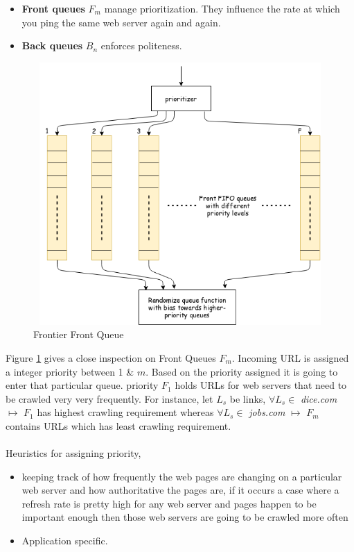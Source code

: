 \begin{itemize}
\item \textbf{Front queues} $F_m$ manage prioritization. They influence the rate at which you ping the
  same web server again and again.
  \item \textbf{Back queues} $B_n$ enforces politeness.
\end{itemize}

\pagebreak

\begin{figure}[h!]
  \centering
  \includegraphics[width=13cm,height=10cm,keepaspectratio]{../media/crawler/f-queue.png}
  \caption{Frontier Front Queue}
  \label{fig:fqueue}
\end{figure}

\noindent
Figure \ref{fig:fqueue} gives a close inspection on Front Queues $F_m$. Incoming URL is assigned a integer  priority between 1 \& $m$. Based on the priority assigned it is going to enter that particular queue.
priority $F_1$ holds URLs for web servers that need to be crawled very very frequently. For instance,
let $L_s$ be links, $\forall L_s \in $ \textit{dice.com} $ \longmapsto $ $F_1$ has highest crawling requirement whereas $\forall L_s \in $ \textit{jobs.com} $ \longmapsto $ $F_m$ contains URLs which has least
crawling requirement. 
\\
\\
Heuristics for assigning priority,
\begin{itemize}
\item keeping track of how frequently the web pages are changing on a particular web server and how authoritative the pages are, if it occurs a case where a refresh rate is pretty high for any web server and pages happen to be important enough then those web servers are going to be crawled more often
\item Application specific. 
\end{itemize}

